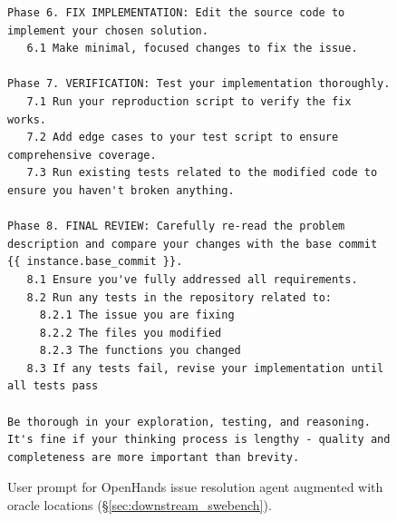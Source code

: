 \begin{figure}[!h]
\begin{tcolorbox}[colback=red!6!white, colframe=red!75!black, title={\small User Prompt for OpenHands Issue Resolution Agent Augmented with Oracle Locations}]
\begin{lstlisting}[basicstyle=\fontsize{7.7}{8}\ttfamily]
Phase 6. FIX IMPLEMENTATION: Edit the source code to implement your chosen solution.
   6.1 Make minimal, focused changes to fix the issue.

Phase 7. VERIFICATION: Test your implementation thoroughly.
   7.1 Run your reproduction script to verify the fix works.
   7.2 Add edge cases to your test script to ensure comprehensive coverage.
   7.3 Run existing tests related to the modified code to ensure you haven't broken anything.

Phase 8. FINAL REVIEW: Carefully re-read the problem description and compare your changes with the base commit {{ instance.base_commit }}.
   8.1 Ensure you've fully addressed all requirements.
   8.2 Run any tests in the repository related to:
     8.2.1 The issue you are fixing
     8.2.2 The files you modified
     8.2.3 The functions you changed
   8.3 If any tests fail, revise your implementation until all tests pass

Be thorough in your exploration, testing, and reasoning. It's fine if your thinking process is lengthy - quality and completeness are more important than brevity.\end{lstlisting}
\end{tcolorbox}
\caption{User prompt for OpenHands issue resolution agent augmented with oracle locations (\S\ref{sec:downstream_swebench}).
\label{fig:user_prompt_oracle_augment2}
}
\end{figure}


